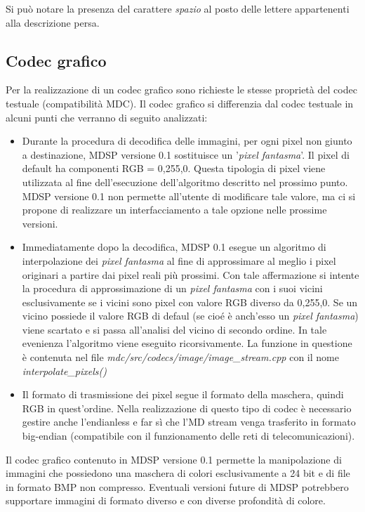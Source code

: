 Si può notare la presenza del carattere \emph{spazio} al posto delle lettere
appartenenti alla descrizione persa.

\subsection{Codec grafico}
Per la realizzazione di un codec grafico sono richieste le stesse proprietà del
codec testuale (compatibilità MDC). Il codec grafico si differenzia dal codec
testuale in alcuni punti che verranno di seguito analizzati:

\begin{itemize}
  \item Durante la procedura di decodifica delle immagini, per ogni pixel
  non giunto a destinazione, MDSP versione 0.1 sostituisce un '\emph{pixel
  fantasma}'. Il pixel di default ha componenti RGB = 0,255,0. Questa
  tipologia di pixel viene utilizzata al fine dell'esecuzione dell'algoritmo
  descritto nel prossimo punto. MDSP versione 0.1 non permette all'utente di
  modificare tale valore, ma ci si propone di realizzare un interfacciamento a tale opzione nelle prossime versioni.
  \item Immediatamente dopo la decodifica, MDSP 0.1 esegue un algoritmo di
  interpolazione dei \emph{pixel fantasma} al fine di approssimare al meglio i
  pixel originari a partire dai pixel reali più prossimi. Con tale affermazione
  si intente la procedura di approssimazione di un \emph{pixel fantasma} con i
  suoi vicini esclusivamente se i vicini sono pixel con valore RGB diverso da
  0,255,0. Se un vicino possiede il valore RGB di defaul (se cioé è anch'esso
  un \emph{pixel fantasma}) viene scartato e si passa all'analisi del vicino di
  secondo ordine. In tale evenienza l'algoritmo viene eseguito ricorsivamente.
  La funzione in questione è contenuta nel file
  \textit{mdc/src/codecs/image/image\_stream.cpp} con il nome
  \textit{interpolate\_pixels()}
  \item Il formato di trasmissione dei pixel segue il formato della maschera,
  quindi RGB in quest'ordine. Nella realizzazione di questo tipo di codec è
  necessario gestire anche l'endianless e far sì che l'MD stream venga
  trasferito in formato big-endian (compatibile con il funzionamento delle reti
  di telecomunicazioni).
\end{itemize}

Il codec grafico contenuto in MDSP versione 0.1 permette la manipolazione di
immagini che possiedono una maschera di colori esclusivamente a 24 bit e di
file in formato BMP non compresso. Eventuali versioni future di MDSP potrebbero
supportare immagini di formato diverso e con diverse profondità di colore.

